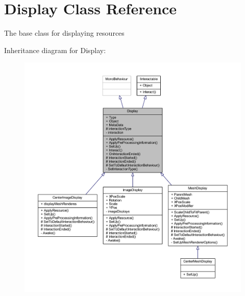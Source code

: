 \hypertarget{class_display}{}\section{Display Class Reference}
\label{class_display}


The base class for displaying resources  




Inheritance diagram for Display\+:
\nopagebreak
\begin{figure}[H]
\begin{center}
\leavevmode
\includegraphics[width=350pt]{class_display__inherit__graph}
\end{center}
\end{figure}


